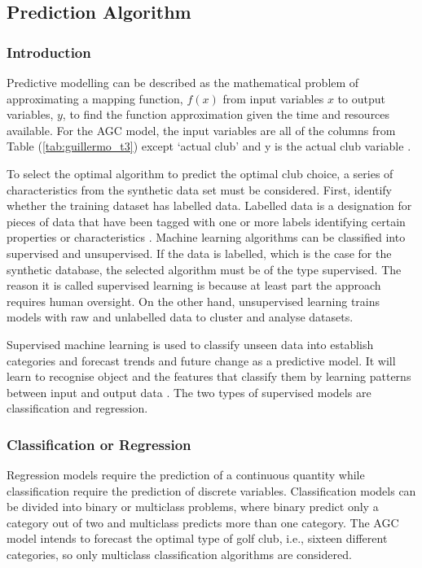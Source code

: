 \documentclass[11pt,landscape]{article}
\begin{document}
\begin{multicols}{3}
\subsection{Prediction Algorithm}
\subsubsection{Introduction}
Predictive modelling can be described as the mathematical problem of
approximating a mapping function, $f(x)$ from input variables $x$ to output
variables, $y$, to find the function approximation given the time and resources
available. For the AGC model, the input variables are all of the columns from
Table (\ref{tab:guillermo_t3}) except `actual club' and y is the actual club
variable \cite{classvsreg}.

To select the optimal algorithm to predict the optimal club choice, a series of
characteristics from the synthetic data set must be considered. First, identify
whether the training dataset has labelled data. Labelled data is a designation
for pieces of data that have been tagged with one or more labels identifying
certain properties or characteristics \cite{labeled_data}. Machine learning
algorithms can be classified into supervised and unsupervised. If the data is
labelled, which is the case for the synthetic database, the selected algorithm
must be of the type supervised. The reason it is called supervised learning is
because at least part the approach requires human oversight. On the other hand,
unsupervised learning trains models with raw and unlabelled data to cluster and
analyse datasets. 

Supervised machine learning is used to classify unseen data into establish
categories and forecast trends and future change as a predictive model. It will
learn to recognise object and the features that classify them by learning
patterns between input and output data \cite{seldon}. The two
types of supervised models are classification and regression. 

\subsubsection{Classification or Regression}
Regression models require the prediction of a continuous quantity while
classification require the prediction of discrete variables. Classification
models can be divided into binary or multiclass problems, where binary predict
only a category out of two and multiclass predicts more than one category. The
AGC model intends to forecast the optimal type of golf club, i.e., sixteen
different categories, so only multiclass classification algorithms are
considered. 


\end{multicols}
\end{document}
